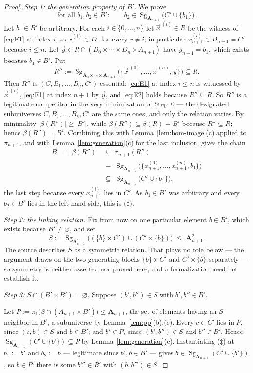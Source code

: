 \documentclass[11pt]{article}
\theoremstyle{mainplain}
\theoremstyle{mainroman}
\theoremstyle{definition}
\numberwithin{equation}{section}
\DeclareMathOperator{\Sg}{Sg}
\newcommand{\bA}{\mathbf A}
\begin{document}
\begin{proof}
\emph{Step 1: the generation property of $B'$.} We prove
\[
 \text{for all }b_1,b_2\in B':\qquad b_2\in\Sg_{\bA_{n+1}}\bigl(C'\cup\{b_1\}\bigr).
 \tag{$\ddagger$}
\]
Let $b_1\in B'$ be arbitrary. For each $i\in\{0,\dots,n\}$ let
$\vec x^{\,(i)}\in R$ be the witness of \eqref{eq:E1} at index $i$, so
$x^{(i)}_{r}\in D_r$ for every $r\ne i$; in particular
$x^{(i)}_{n+1}\in D_{n+1}=C'$ because $i\le n$. Let
$\vec y\in R\cap(D_0\times\cdots\times D_n\times A_{n+1})$ have
$y_{n+1}=b_1$, which exists because $b_1\in B'$. Put
\[
 R'':=\Sg_{\bA_0\times\cdots\times\bA_{n+1}}\bigl(\{\vec x^{\,(0)},\dots,\vec x^{\,(n)},\vec y\}\bigr)\subseteq R .
\]
Then $R''$ is $(C,B_1,\dots,B_n,C')$-essential: \eqref{eq:E1} at index $i\le n$
is witnessed by $\vec x^{\,(i)}$, \eqref{eq:E1} at index $n+1$ by $\vec y$, and
\eqref{eq:E2} holds because $R''\subseteq R$. So $R''$ is a legitimate
competitor in the very minimization of Step~0 --- the designated subuniverses
$C,B_1,\dots,B_n,C'$ are the same ones, and only the relation varies. By
minimality $|\beta(R'')|\ge|B'|$, while $\beta(R'')\subseteq\beta(R)=B'$ because
$R''\subseteq R$; hence $\beta(R'')=B'$. Combining this with
Lemma~\ref{lem:hom-image}(c) applied to $\pi_{n+1}$, and with
Lemma~\ref{lem:generation}(c) for the last inclusion, gives the chain
\[
 \begin{aligned}
 B'\;=\;\beta(R'')\;&\subseteq\;\pi_{n+1}(R'')\\
   &=\;\Sg_{\bA_{n+1}}\bigl(\{x^{(0)}_{n+1},\dots,x^{(n)}_{n+1},b_1\}\bigr)\\
   &\subseteq\;\Sg_{\bA_{n+1}}\bigl(C'\cup\{b_1\}\bigr),
 \end{aligned}
\]
the last step because every $x^{(i)}_{n+1}$ lies in $C'$. As $b_1\in B'$ was
arbitrary and every $b_2\in B'$ lies in the left-hand side, this is
($\ddagger$).

\emph{Step 2: the linking relation.} Fix from now on one particular element
$b\in B'$, which exists because $B'\ne\varnothing$, and set
\[
 S:=\Sg_{\bA_{n+1}^2}\bigl((\{b\}\times C')\cup(C'\times\{b\})\bigr)\;\le\;\bA_{n+1}^2 .
\]
The source describes $S$ as a symmetric relation. That plays no role below ---
the argument draws on the two generating blocks $\{b\}\times C'$ and
$C'\times\{b\}$ separately --- so symmetry is neither asserted nor proved here,
and a formalization need not establish it.

\emph{Step 3: $S\cap(B'\times B')=\varnothing$.} Suppose $(b',b'')\in S$ with
$b',b''\in B'$.

Let $P:=\pi_1\bigl(S\cap(A_{n+1}\times B')\bigr)\le\bA_{n+1}$, the set of
elements having an $S$-neighbor in $B'$, a subuniverse by
Lemma~\ref{lem:pp}(b),(c). Every $c\in C'$ lies in $P$, since $(c,b)\in S$ and
$b\in B'$; and $b'\in P$, since $(b',b'')\in S$ and $b''\in B'$. Hence
$\Sg_{\bA_{n+1}}(C'\cup\{b'\})\subseteq P$ by Lemma~\ref{lem:generation}(c).
Instantiating ($\ddagger$) at $b_1:=b'$ and $b_2:=b$ --- legitimate since
$b',b\in B'$ --- gives $b\in\Sg_{\bA_{n+1}}(C'\cup\{b'\})$, so $b\in P$: there
is some $b'''\in B'$ with $(b,b''')\in S$.


\end{proof}
\end{document}

